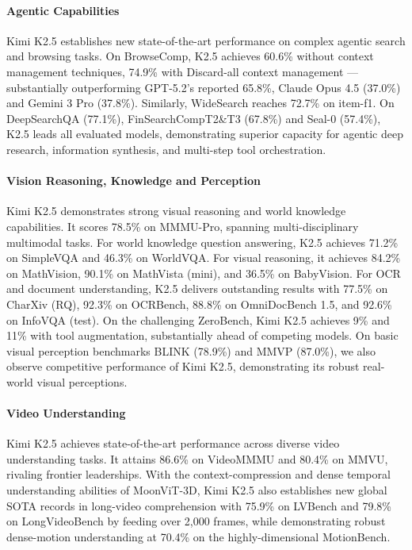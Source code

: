 \documentclass{article}
\newcommand{\citep}[1]{\parencite{#1}}
\begin{document}
\paragraph{Agentic Capabilities}
Kimi K2.5 establishes new state-of-the-art performance on complex agentic search and browsing tasks. On BrowseComp, K2.5 achieves 60.6\% without context management techniques, 74.9\% with Discard-all context management \citep{deepseekai2025deepseekv32pushingfrontieropen} — substantially outperforming GPT-5.2's reported 65.8\%, Claude Opus 4.5 (37.0\%) and Gemini 3 Pro (37.8\%). Similarly, WideSearch reaches 72.7\% on item-f1. On DeepSearchQA (77.1\%), FinSearchCompT2\&T3 (67.8\%) and Seal-0 (57.4\%), K2.5 leads all evaluated models, demonstrating superior capacity for agentic deep research, information synthesis, and multi-step tool orchestration.

\paragraph{Vision Reasoning, Knowledge and Perception} Kimi K2.5 demonstrates strong visual reasoning and world knowledge capabilities. It scores 78.5\% on MMMU-Pro, spanning multi-disciplinary multimodal tasks. For world knowledge question answering, K2.5 achieves 71.2\% on SimpleVQA and 46.3\% on WorldVQA. For visual reasoning, it achieves 84.2\% on MathVision, 90.1\% on MathVista (mini), and 36.5\% on BabyVision. For OCR and document understanding, K2.5 delivers outstanding results with 77.5\% on CharXiv (RQ), 92.3\% on OCRBench, 88.8\% on OmniDocBench 1.5, and 92.6\% on InfoVQA (test). On the challenging ZeroBench, Kimi K2.5 achieves 9\% and 11\% with tool augmentation, substantially ahead of competing models. On basic visual perception benchmarks BLINK (78.9\%) and MMVP (87.0\%), we also observe competitive performance of Kimi K2.5, demonstrating its robust real-world visual perceptions.

\paragraph{Video Understanding} Kimi K2.5 achieves state-of-the-art performance across diverse video understanding tasks. It attains 86.6\% on VideoMMMU and 80.4\% on MMVU, rivaling frontier leaderships. With the context-compression and dense temporal understanding abilities of MoonViT-3D, Kimi K2.5 also establishes new global SOTA records in long-video comprehension with 75.9\% on LVBench and 79.8\% on LongVideoBench by feeding over 2,000 frames, while demonstrating robust dense-motion understanding at 70.4\% on the highly-dimensional MotionBench.
\end{document}
